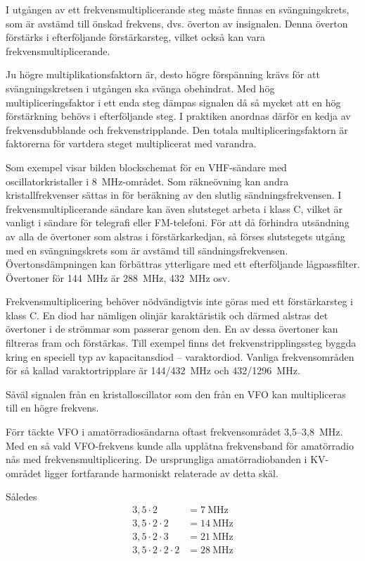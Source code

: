 I utgången av ett frekvensmultiplicerande steg måste finnas en
svängningskrets, som är avstämd till önskad frekvens, dvs. överton
av insignalen.
Denna överton förstärks i efterföljande förstärkarsteg, vilket också kan vara
frekvensmultiplicerande.

Ju högre multiplikationsfaktorn är, desto högre förspänning krävs för
att svängningskretsen i utgången ska svänga obehindrat.
Med hög multipliceringsfaktor i ett enda steg dämpas signalen då så mycket att
en hög förstärkning behövs i efterföljande steg.
I praktiken anordnas därför en kedja av frekvensdubblande och
frekvenstripplande.
Den totala multipliceringsfaktorn är faktorerna för vartdera steget
multiplicerat med varandra.

Som exempel visar bilden blockschemat för en VHF-sändare med
oscillatorkristaller i 8~MHz-området.
Som räkneövning kan andra kristallfrekvenser sättas in för beräkning av den
slutlig sändningsfrekvensen.
I frekvensmultiplicerande sändare kan även slutsteget arbeta i klass C, vilket
är vanligt i sändare för telegrafi eller FM-telefoni.
För att då förhindra utsändning av alla de övertoner som alstras i
förstärkarkedjan, så förses slutstegets utgång med en svängningskrets som är
avstämd till sändningsfrekvensen.
Övertonsdämpningen kan förbättras ytterligare med ett efterföljande
lågpassfilter.
Övertoner för 144~MHz är 288~MHz, 432~MHz osv.

Frekvensmultiplicering behöver nödvändigtvis inte göras med ett förstärkarsteg
i klass C.
En diod har nämligen olinjär karaktäristik och därmed alstras det övertoner i
de strömmar som passerar genom den.
En av dessa övertoner kan filtreras fram och förstärkas.
Till exempel finns det frekvenstripplingssteg byggda kring en speciell typ av
kapacitansdiod -- varaktordiod.
Vanliga frekvensområden för så kallad varaktortripplare är 144/432~MHz och
432/1296~MHz.

Såväl signalen från en kristalloscillator som den från en VFO kan
multipliceras till en högre frekvens.

Förr täckte VFO i amatörradiosändarna oftast frekvensområdet 3,5--3,8~MHz.
Med en så vald VFO-frekvens kunde alla upplåtna frekvensband för
amatörradio nås med frekvensmultiplicering.
De ursprungliga amatörradiobanden i KV-området ligger fortfarande harmoniskt
relaterade av detta skäl.

Således
\begin{align*}
  3,5 \cdot 2 & = 7\ \text{MHz} \\
  3,5 \cdot 2 \cdot 2 & = 14\ \text{MHz} \\
  3,5 \cdot 2 \cdot 3 & = 21\ \text{MHz} \\
  3,5 \cdot 2 \cdot 2 \cdot 2 & = 28\ \text{MHz} \\
\end{align*}

